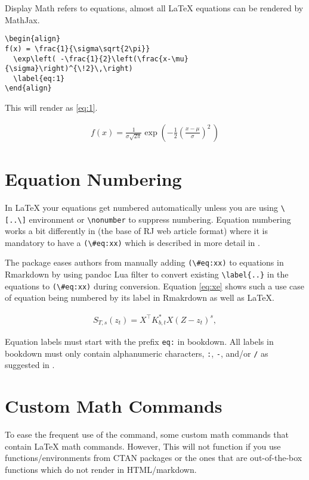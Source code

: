 Display Math refers to equations, almost all LaTeX equations can be rendered by
MathJax.

\begin{verbatim}
\begin{align}
f(x) = \frac{1}{\sigma\sqrt{2\pi}} 
  \exp\left( -\frac{1}{2}\left(\frac{x-\mu}{\sigma}\right)^{\!2}\,\right)
  \label{eq:1}
\end{align}
\end{verbatim}
This will render as \ref{eq:1}.

\begin{align}
\label{eq:1}
f(x) = \frac{1}{\sigma\sqrt{2\pi}} 
  \exp\left( -\frac{1}{2}\left(\frac{x-\mu}{\sigma}\right)^{\!2}\,\right)
\end{align}

\section{Equation Numbering}
In LaTeX your equations get numbered automatically unless you are using \verb|\[..\]| environment or \verb|\nonumber| to suppress
numbering. Equation numbering works a bit differently in  (the base of RJ web article format) where
it is mandatory to have a \verb|(\#eq:xx)| which is described in more detail in \citep{bookdown}.

The  package eases authors from manually adding \verb|(\#eq:xx)| to equations in Rmarkdown
by using pandoc Lua filter to convert existing \verb|\label{..}| in the equations to \verb|(\#eq:xx)|
during conversion. Equation \ref{eq:xe} shows such a use case of equation being numbered by its label in Rmakrdown
as well as LaTeX.

\begin{align}
S_{T, s}(z_t) = X^{\top} K_{b,t}^* X (Z - z_t)^s, 
\label{eq:xe}
\end{align}

Equation labels must start with the prefix \verb|eq:| in bookdown. All labels in bookdown must only contain alphanumeric characters, \verb|:|, \verb|-|, and/or \verb|/| as suggested in \citep{bookdown}. 

\section{Custom Math Commands}

To ease the frequent use of the command, some custom math commands that contain LaTeX math commands. 
However, This will not function if you use functions/environments from CTAN packages or 
the ones that are out-of-the-box functions which do not render in HTML/markdown.

